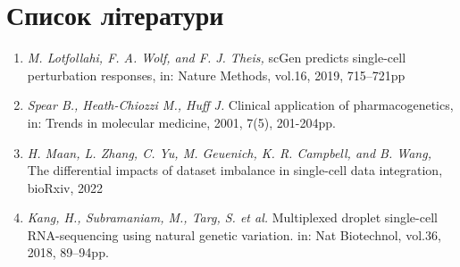  \section{Список літератури}
\begin{enumerate}

\item{{\it M. Lotfollahi, F. A. Wolf, and F. J. Theis,} scGen predicts single-cell
perturbation responses, in: Nature Methods, vol.16, 2019, 715–721pp}

\item{{\it Spear B., Heath-Chiozzi M., Huff J.} Clinical application of pharmacogenetics, in: Trends in molecular medicine, 2001, 7(5), 201-204pp.}

\item{{\it H. Maan, L. Zhang, C. Yu, M. Geuenich, K. R. Campbell, and B. Wang,} The differential impacts of dataset imbalance in single-cell data integration, bioRxiv, 2022}

\item{{\it Kang, H., Subramaniam, M., Targ, S. et al.} Multiplexed droplet single-cell RNA-sequencing using natural genetic variation. in: Nat Biotechnol, vol.36, 2018, 89–94pp.}

\end{enumerate}
